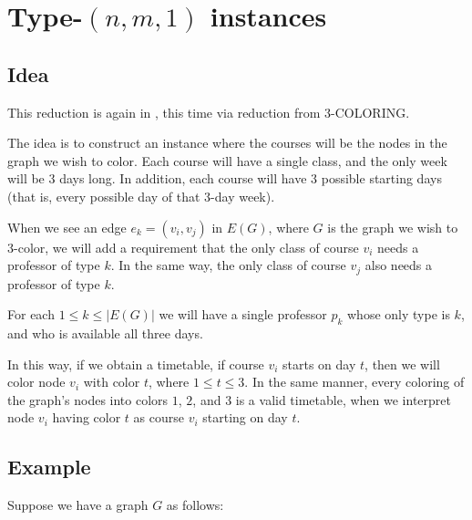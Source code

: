 \section{Type-$(n, m, 1)$ instances}
\subsection{Idea}
This reduction is again in \npc, this time via reduction from 3-COLORING\cite{Garey:1990:CIG:574848}.

The idea is to construct an instance where the courses will be the nodes in the graph we wish to color. Each course will have a single class, and the only week will be 3 days long. In addition, each course will have 3 possible starting days (that is, every possible day of that 3-day week).

When we see an edge $e_k = (v_i, v_j)$ in $E(G)$, where $G$ is the graph we wish to 3-color, we will add a requirement that the only class of course $v_i$ needs a professor of type $k$. In the same way, the only class of course $v_j$ also needs a professor of type $k$.

For each $1 \le k \le |E(G)|$ we will have a single professor $p_k$ whose only type is $k$, and who is available all three days.

In this way, if we obtain a timetable, if course $v_i$ starts on day $t$, then we will color node $v_i$ with color $t$, where $1 \le t \le 3$. In the same manner, every coloring of the graph's nodes into colors $1$, $2$, and $3$ is a valid timetable, when we interpret node $v_i$ having color $t$ as course $v_i$ starting on day $t$.

\subsection{Example}
Suppose we have a graph $G$ as follows:

\begin{center}
\end{center}

